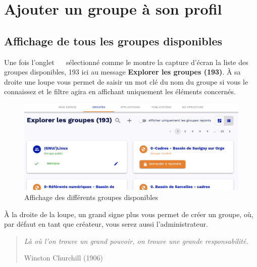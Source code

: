 \section{Ajouter un groupe à son profil}

\subsection{Affichage de tous les groupes disponibles}
Une fois l'onglet \og~~\fg{} sélectionné comme le montre la capture d'écran la liste des groupes disponibles, 193 ici au message \textbf{Explorer les groupes (193)}. 
À sa droite une loupe vous permet de saisir un mot clé du nom du groupe si vous le connaissez et le filtre agira en affichant uniquement les éléments concernés.
\begin{figure}
	\centering
	\includegraphics{./Captures/portail.groupes.selection.png}
	\caption{Affichage des différents groupes disponibles}
\end{figure}

À la droite de la loupe, un grand signe plus vous permet de créer un groupe, où, par défaut en tant que créateur, vous serez aussi l'administrateur.

\begin{quote}
	\emph{Là où l’on trouve un grand pouvoir, on trouve une grande responsabilité.}\newline
	\begin{flushright} Winston Churchill (1906) \end{flushright}
\end{quote}


